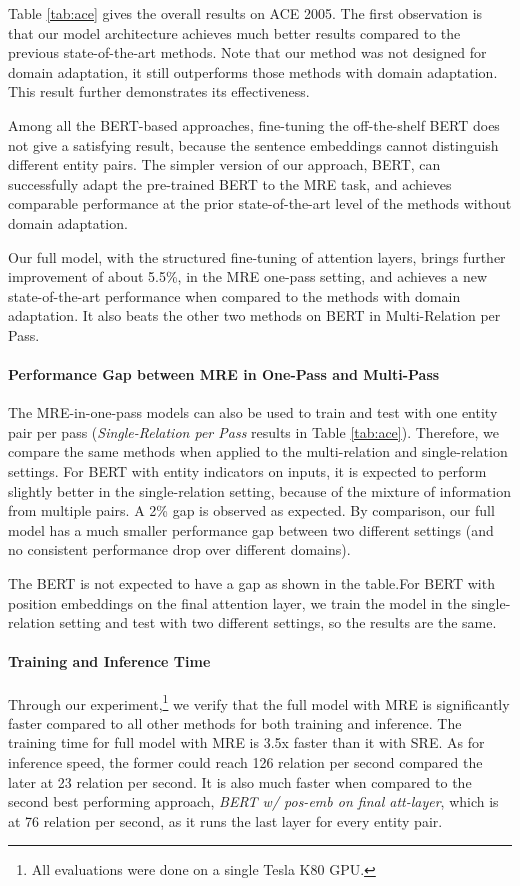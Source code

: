 \documentclass[11pt,a4paper]{article}
\begin{document}
Table \ref{tab:ace} gives the overall results on ACE 2005. The first observation is that our model architecture achieves much better results compared to the previous state-of-the-art methods. Note that our method was not designed for domain adaptation, it still outperforms those methods with domain adaptation. This result further demonstrates its effectiveness.

Among all the BERT-based approaches, fine-tuning the off-the-shelf BERT does not give a satisfying result, because the sentence embeddings cannot distinguish different entity pairs.
The simpler version of our approach, BERT, can successfully adapt the pre-trained BERT to the MRE task, and achieves comparable performance at the prior state-of-the-art level of the methods without domain adaptation.

Our full model, with the structured fine-tuning of attention layers, brings further improvement of about 5.5\%, in the MRE one-pass setting, and achieves a new state-of-the-art performance when compared to the methods with domain adaptation. It also beats the other two methods on BERT in Multi-Relation per Pass.

\paragraph{Performance Gap between MRE in One-Pass and Multi-Pass}
The MRE-in-one-pass models can also be used to train and test with one entity pair per pass (\emph{Single-Relation per Pass} results in Table \ref{tab:ace}).
Therefore, we compare the same methods when applied to the multi-relation and single-relation settings.
For BERT with entity indicators on inputs, it is expected to perform slightly better in the single-relation setting, because of the mixture of information from multiple pairs. A 2\% gap is observed as expected. 
By comparison, our full model has a much smaller performance gap between two different settings (and no consistent performance drop over different domains).

The BERT is not expected to have a gap as shown in the table.For BERT with position embeddings on the final attention layer, we train the model in the single-relation setting and test with two different settings, so the results are the same.

\paragraph{Training and Inference Time}
Through our experiment,\footnote{All evaluations were done on a single Tesla K80 GPU.} we verify that the full model with MRE is significantly faster compared to all other methods for both training and inference. The training time for full model with MRE is 3.5x faster than it with SRE. As for inference speed, the former could reach 126 relation per second compared the later at 23 relation per second. It is also much faster when compared to the second best performing approach, \emph{BERT w/ pos-emb on final att-layer}, which is at 76 relation per second, as it runs the last layer for every entity pair.
\end{document}
